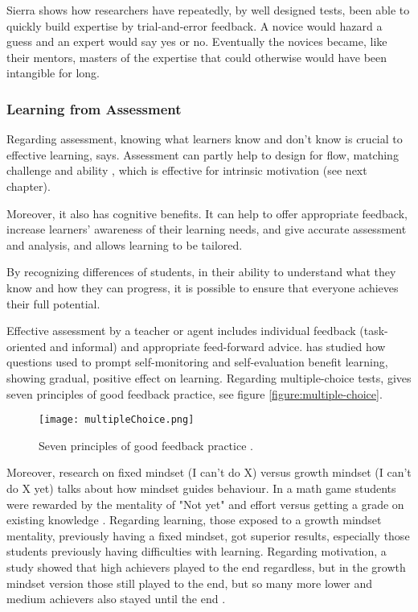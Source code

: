   Sierra shows how researchers have repeatedly, by well designed tests, been able to quickly build expertise by trial-and-error feedback. A novice would hazard a guess and an expert would say yes or no. Eventually the novices became, like their mentors, masters of the expertise that could otherwise would have been intangible for long.

  \subsubsection{Learning from Assessment}\label{learning-assessment}

  Regarding assessment, knowing what learners know and don't know is crucial to effective learning, \cite{luckin} says. Assessment can partly help to design for flow, matching challenge and ability \citep{bruhlmann}, which is effective for intrinsic motivation (see next chapter).

  Moreover, it also has cognitive benefits. It can help to offer appropriate feedback, increase learners' awareness of their learning needs, and give accurate assessment and analysis, and allows learning to be tailored.

  By recognizing differences of students, in their ability to understand what they know and how they can progress, it is possible to ensure that everyone achieves their full potential.

  Effective assessment by a teacher or agent includes individual feedback (task-oriented and informal) and appropriate feed-forward advice. \cite{sitzmann} has studied how questions used to prompt self-monitoring and self-evaluation benefit learning, showing gradual, positive effect on learning. Regarding multiple-choice tests, \cite{nicol} gives seven principles of good feedback practice, see figure \ref{figure:multiple-choice}.

  \begin{figure}[h]
    \centering
    \texttt{[image: multipleChoice.png]}
    \caption{Seven principles of good feedback practice \cite{nicol}.}
    \label{fig:sierra-practice}
\end{figure}

  Moreover, research on fixed mindset (I can't do X) versus growth mindset (I can't do X yet) talks about how mindset guides behaviour. In a math game students were rewarded by the mentality of "Not yet" and effort versus getting a grade on existing knowledge \citep{dweck-youtube}. Regarding learning, those exposed to a growth mindset mentality, previously having a fixed mindset, got superior results, especially those students previously having difficulties with learning. Regarding motivation, a study showed that high achievers played to the end regardless, but in the growth mindset version those still played to the end, but so many more lower and medium achievers also stayed until the end \citep{dweck-youtube}.

